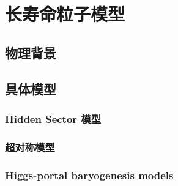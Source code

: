 
\chapter{长寿命粒子模型}

\section{物理背景}

\section{具体模型}

\subsection{Hidden Sector 模型}

\subsection{超对称模型}

\subsection{Higgs-portal baryogenesis models}

